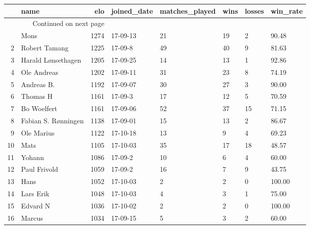 \begin{longtable}{|r|l|r|l|l|l|l|l|}
\toprule
{} &                 name &   elo & joined\_date &  matches\_played &  wins &  losses &  win\_rate \\
\midrule
\endhead
\midrule
\multicolumn{3}{r}{{Continued on next page}} \\
\midrule
\endfoot

\bottomrule
\endlastfoot
1  &                 Mons &  1274 &    17-09-13 &              21 &    19 &       2 &     90.48 \\
2  &        Robert Tamang &  1225 &     17-09-8 &              49 &    40 &       9 &     81.63 \\
3  &   Harald Lønsethagen &  1205 &    17-09-25 &              14 &    13 &       1 &     92.86 \\
4  &          Ole Andreas &  1202 &    17-09-11 &              31 &    23 &       8 &     74.19 \\
5  &           Andreas B. &  1192 &    17-09-07 &              30 &    27 &       3 &     90.00 \\
6  &             Thomas H &  1161 &     17-09-3 &              17 &    12 &       5 &     70.59 \\
7  &          Bo Woelfert &  1161 &    17-09-06 &              52 &    37 &      15 &     71.15 \\
8  &  Fabian S. Rønningen &  1138 &    17-09-01 &              15 &    13 &       2 &     86.67 \\
9  &           Ole Marius &  1122 &    17-10-18 &              13 &     9 &       4 &     69.23 \\
10 &                 Mats &  1105 &    17-10-03 &              35 &    17 &      18 &     48.57 \\
11 &               Yohann &  1086 &     17-09-2 &              10 &     6 &       4 &     60.00 \\
12 &         Paul Frivold &  1059 &     17-09-2 &              16 &     7 &       9 &     43.75 \\
13 &                 Hans &  1052 &    17-10-03 &               2 &     2 &       0 &    100.00 \\
14 &            Lars Erik &  1048 &    17-10-03 &               4 &     3 &       1 &     75.00 \\
15 &             Edvard N &  1036 &    17-10-02 &               2 &     2 &       0 &    100.00 \\
16 &               Marcus &  1034 &    17-09-15 &               5 &     3 &       2 &     60.00 \\

\end{longtable}
